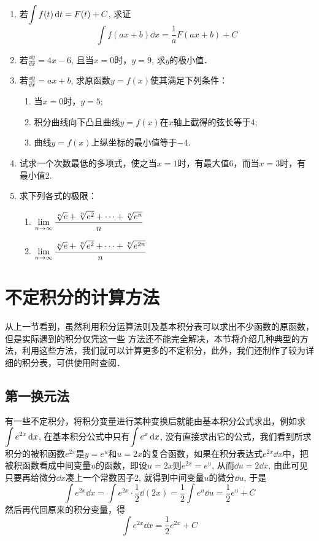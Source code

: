 \begin{ex}
\begin{enumerate}
\item 若$\displaystyle\int f(t)\,{\rm d} t=F(t)+C$, 求证
\[\int f (ax+b) \dd x=\frac{1}{a}F (ax+b) +C\]
\item  若$\frac{\dd y}{\dd x}=4x-6$, 且当$x=0$时，$y=9$, 求$y$的极小值．
\item  若$\frac{\dd y}{\dd x}=ax+b$, 求原函数$y=f(x)$使其满足下列条件：
\begin{enumerate}
    \item 当$x=0$时，$y=5$;
    \item 积分曲线向下凸且曲线$y=f(x)$在$x$轴上截得的弦长等于4;
    \item 曲线$y=f(x)$上纵坐标的最小值等于$-4$.
\end{enumerate}
\item 试求一个次数最低的多项式，使之当$x=1$时，有最大值6，而当$x=3$时，有最小值2.
\item  求下列各式的极限：
\begin{enumerate}
    \item $\displaystyle\lim_{n\to\infty}\dfrac{\sqrt[n]{e}+\sqrt[n]{e^2}+\cdots+\sqrt[n]{e^n}}{n}$
    \item $\displaystyle\lim_{n\to\infty}\dfrac{\sqrt[n]{e}+\sqrt[n]{e^2}+\cdots+\sqrt[n]{e^{2n}}}{n}$
\end{enumerate}
\end{enumerate}

\end{ex}


\section{不定积分的计算方法}
从上一节看到，虽然利用积分运算法则及基本积分表可以求出不少函数的原函数，但是实际遇到的积分仅凭这一些
方法还不能完全解决，本节将介绍几种典型的方法，利用这些方法，我们就可以计算更多的不定积分，此外，我们还制作了较为详细的积分表，可供使用时查阅．

\subsection{第一换元法}

有一些不定积分，将积分变量进行某种变换后就能由基本积分公式求出，例如求$\displaystyle\int e^{2x}\,{\rm d} x$, 在基本积分公式中只有$\displaystyle\int e^x\,{\rm d} x$, 没有直接求出它的公式，我们看到所求积分的被积函数$e^{2x}$是$y=e^u$和$u=2x$的复合函数，如果在积分表达式$e^{2x}\dd x$中，把被积函数看成中间变量$u$的函数，即设$u=2x$则$e^{2x}=e^u$, 从而$\dd u=2\dd x$, 由此可见只要再给微分$\dd x$凑上一个常数因子2, 就得到中间变量$u$的微分$\dd u$, 于是
\[\int e^{2x}\dd x=\int e^{2x}\cdot \frac{1}{2}\dd (2x) =\frac{1}{2}\int e^u\dd u=\frac{1}{2}e^u+C\]
然后再代回原来的积分变量，得
\[\int e^{2x}\dd x=\frac{1}{2}e^{2x}+C\]

